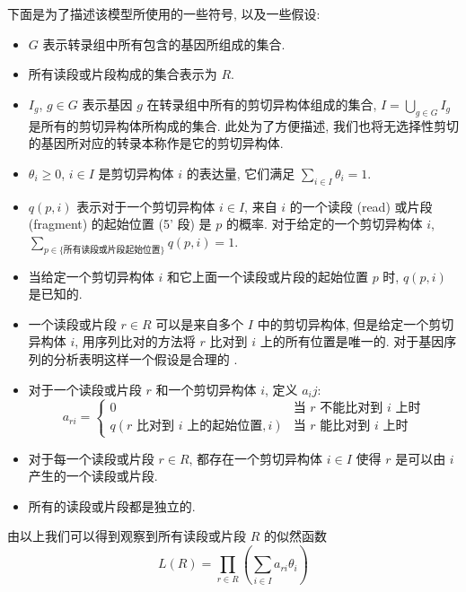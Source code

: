 下面是为了描述该模型所使用的一些符号, 以及一些假设: 
\begin{itemize}
\item $G$ 表示转录组中所有包含的基因所组成的集合. 

\item 所有读段或片段构成的集合表示为 $R$. 

\item $I_g$, $g \in G$ 表示基因 $g$ 在转录组中所有的剪切异构体组成的集合, 
$I = \bigcup_{g \in G} I_g$ 是所有的剪切异构体所构成的集合. 
此处为了方便描述, 我们也将无选择性剪切的基因所对应的转录本称作是它的剪切异构体. 

\item $\theta_i \geq 0$, $i \in I$ 是剪切异构体 $i$ 的表达量, 
它们满足 $\sum_{i \in I} \theta_i = 1$. 

\item $q(p, i)$ 表示对于一个剪切异构体 $i \in I$, 
来自 $i$ 的一个读段 (read) 或片段 (fragment) 的起始位置 (5' 段) 是 $p$ 的概率. 
对于给定的一个剪切异构体 $i$, 
$\sum_{p \in \{ \text{所有读段或片段起始位置} \}} q(p, i) = 1$. 

\item 当给定一个剪切异构体 $i$ 和它上面一个读段或片段的起始位置 $p$ 时, 
$q(p, i)$ 是已知的. 

\item 一个读段或片段 $r \in R$ 可以是来自多个 $I$ 中的剪切异构体, 
但是给定一个剪切异构体 $i$, 
用序列比对的方法将 $r$ 比对到 $i$ 上的所有位置是唯一的. 
对于基因序列的分析表明这样一个假设是合理的 \cite{peng2011t}. 

\item 对于一个读段或片段 $r$ 和一个剪切异构体 $i$, 定义 $a_ij$: 
\[
a_{ri} = \begin{cases}
0 & \text{当 $r$ 不能比对到 $i$ 上时} \\
q(\text{$r$ 比对到 $i$ 上的起始位置},i) & \text{当 $r$ 能比对到 $i$ 上时} \end{cases}
\]

\item 对于每一个读段或片段 $r \in R$, 
都存在一个剪切异构体 $i \in I$ 使得 $r$ 是可以由 $i$ 产生的一个读段或片段. 

\item 所有的读段或片段都是独立的. 
\end{itemize}

由以上我们可以得到观察到所有读段或片段 $R$ 的似然函数
\begin{equation}
L(R) = \prod_{r \in R} (\sum_{i \in I} a_{ri} \theta_i)
\end{equation}












